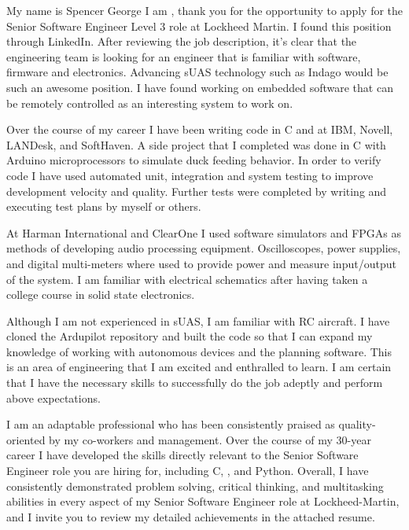 \documentclass[11pt, a4paper]{awesome-cv}
\begin{document}
\makecvheader

\makelettertitle

\begin{cvletter}
My name is Spencer George I am , thank you for the opportunity to apply for the Senior Software Engineer Level 3 role at Lockheed Martin. I found this position through LinkedIn. After reviewing the job description, it's clear that the engineering team is looking for an engineer that is familiar with software, firmware and electronics. Advancing sUAS technology such as Indago would be such an awesome position. I have found working on embedded software that can be remotely controlled as an interesting system to work on.  

Over the course of my career I have been writing code in C and \Cpp  at IBM, Novell, LANDesk, and SoftHaven. A side project that I completed was done in C with Arduino microprocessors to simulate duck feeding behavior. In order to verify code I have used automated unit, integration and system testing to improve development velocity and quality. Further tests were completed by writing and executing test plans by myself or others. 

At Harman International and ClearOne I used software simulators and FPGAs as methods of developing audio processing equipment. Oscilloscopes, power supplies, and digital multi-meters where used to provide power and measure input/output of the system. I am familiar with electrical schematics after having taken a college course in solid state electronics.

Although I am not experienced in sUAS, I am familiar with RC aircraft. I have cloned the Ardupilot repository and built the code so that I can expand my knowledge of working with autonomous devices and the planning software. This is an area of engineering that I am excited and enthralled to learn. I am certain that I have the necessary skills to successfully do the job adeptly and perform above expectations.

I am an adaptable professional who has been consistently praised as quality-oriented by my co-workers and management. Over the course of my 30-year career I have developed the skills directly relevant to the Senior Software Engineer role you are hiring for, including C, \Cpp, and Python. Overall, I have consistently demonstrated problem solving, critical thinking, and multitasking abilities in every aspect of my Senior Software Engineer role at Lockheed-Martin, and I invite you to review my detailed achievements in the attached resume.


\end{cvletter}
\end{document}
